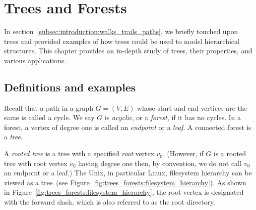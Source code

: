 
\chapter{Trees and Forests}
\label{chap:trees_forests}

In section~\ref{subsec:introduction:walks_trails_paths}, we briefly
touched upon trees and provided examples of how trees could be used to
model hierarchical structures. This chapter provides an in-depth study
of trees, their properties, and various applications.

{
}



\section{Definitions and examples}

Recall that a path in a graph $G = (V, E)$ whose start and end vertices
are the same is called a cycle. We say $G$ is
\emph{acyclic}, or a \emph{forest}, if it
has no cycles. In a forest, a vertex of degree one is called an
\emph{endpoint} or a \emph{leaf}. A
connected forest is a \emph{tree}.

A \emph{rooted tree} is a tree with a specified
\emph{root} vertex $v_0$. (However, if $G$ is a rooted
tree with root vertex $v_0$ having degree one then, by convention, we
do not call $v_0$ an endpoint or a leaf.) The Unix, in
particular Linux, filesystem hierarchy
can be viewed as a tree~(see
Figure~\ref{fig:trees_forests:filesystem_hierarchy}). As shown in
Figure~\ref{fig:trees_forests:filesystem_hierarchy}, the root vertex
is designated with the forward slash, which is also referred to as the
root directory.

